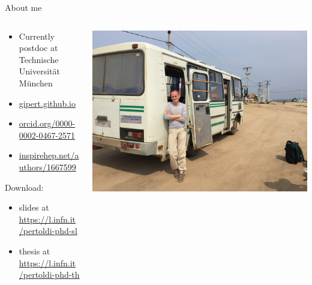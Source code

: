 \documentclass[10pt,aspectratio=169]{beamer}
\institute{Universit\`a degli Studi di Padova / INFN Padova}
\title{\mytitle}
\date{\place\ \sep\ \mydate}
\author{\people}
\begin{document}
\maketitle
\begin{frame}{About me}
  \begin{columns}
    \begin{column}{0.45\textwidth}
      \begin{itemize}
        \item Currently postdoc at Technische Universit\"at M\"unchen
        \item \href{https://gipert.github.io}{gipert.github.io}
        \item \href{https://orcid.org/0000-0002-0467-2571}{orcid.org/0000-0002-0467-2571}
        \item \href{https://inspirehep.net/authors/1667599}{inspirehep.net/authors/1667599}
      \end{itemize}\vspace{16pt}

      {\footnotesize
        Download:
        \begin{itemize}
          \item slides at \url{https://l.infn.it/pertoldi-phd-sl}
          \item thesis at \url{https://l.infn.it/pertoldi-phd-th}
        \end{itemize}
      }
    \end{column}
    \begin{column}{0.55\textwidth}
      \vspace*{5mm}
      \includegraphics[trim=0 0 0 0,clip,width=\columnwidth]{me-siberia.jpg}
    \end{column}
  \end{columns}
\end{frame}
\end{document}
